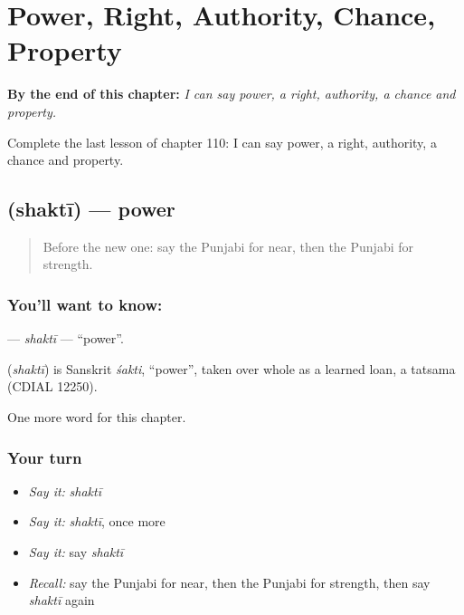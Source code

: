 
\chapter{Power, Right, Authority, Chance, Property}
\label{ch:pa-power-right-authority-chance-property}

\begin{chapteropening}
\textbf{By the end of this chapter:} \emph{I can say power, a right, authority, a chance and property.}

Complete the last lesson of chapter 110: I can say power, a right, authority, a chance and property.
\end{chapteropening}

\section[\texorpdfstring{\pa{ਸ਼ਕਤੀ} (shaktī)}{ਸ਼ਕਤੀ (shaktī)}]{ (shaktī) — power}

\label{lesson:PA-C110-shakti}



\begin{quote}
Before the new one: say the Punjabi for near, then the Punjabi for strength.
\end{quote}

\subsection*{You'll want to know: }
\textbf{} — \emph{shaktī} — \textquotedblleft{}power\textquotedblright{}.

\begin{cousinweb}
\textbf{} (\emph{shaktī}) is Sanskrit \emph{śakti}, \textquotedblleft{}power\textquotedblright{}, taken over whole as a learned loan, a tatsama (CDIAL 12250).
\end{cousinweb}

\begin{grammarlens}[title={What you've built}]
One more word for this chapter.
\end{grammarlens}

\subsection*{Your turn}
\begin{itemize}
\raggedright
  \item \emph{Say it:} \emph{shaktī}
  \item \emph{Say it:} \emph{shaktī}, once more
  \item \emph{Say it:} say \emph{shaktī}
  \item \emph{Recall:} say the Punjabi for near, then the Punjabi for strength, then say \emph{shaktī} again
\end{itemize}


